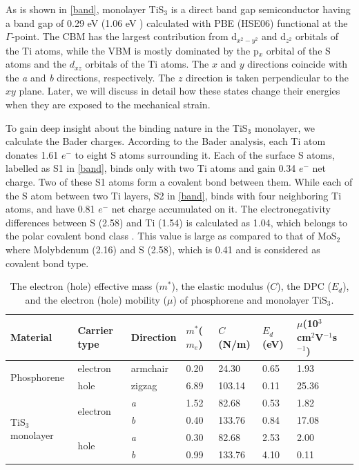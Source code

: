 As is shown in \autoref{band}, monolayer TiS$_3$ is a direct band gap semiconductor having a band gap of 0.29 eV (1.06 eV \cite{Dai2015}) calculated with PBE (HSE06) functional at the $\Gamma$-point.  The CBM has the largest contribution from d$_{x^2-y^2}$ and d$_{z^2}$ orbitals of the Ti atoms, while the VBM is mostly dominated by the p$_x$ orbital of the S atoms and  the $d_{xz}$ orbitals of the Ti atoms. The $x$ and $y$ directions coincide with the \textit{a} and \textit{b} directions, respectively. The $z$ direction is taken perpendicular to the $xy$ plane. Later, we will discuss in detail how these states change their energies when they are exposed to the mechanical strain.

To gain deep insight about the binding nature in the TiS$_3$ monolayer, we calculate the Bader charges\cite{Bader1,Bader2,Bader3,Bader4}. According to the Bader analysis, each Ti atom donates 1.61 $e^-$ to eight S atoms surrounding it. Each of the surface S atoms, labelled as S1 in \autoref{band}, binds only with two Ti atoms and gain 0.34 $e^-$ net charge. Two of these S1 atoms form a covalent bond between them. While each of the S atom between two Ti layers, S2 in \autoref{band}, binds with four neighboring Ti atoms, and have 0.81 $e^-$ net charge accumulated on it.  The electronegativity differences between S (2.58) and Ti (1.54) is calculated as 1.04, which belongs to the polar covalent bond class \cite{David2015}.  This value is large as compared to that of MoS$_2$ where Molybdenum (2.16) and S (2.58), which is 0.41 and is considered as covalent bond type.

\begin{table}[ht]
\caption{The electron (hole) effective mass ($m^*$), the elastic modulus ($C$), the DPC ($E_d$), and the electron (hole) mobility ($\mu$) of phosphorene and monolayer TiS$_3$.}
\centering
\begin{footnotesize}
\begin{tabularx}{\textwidth}{l|lXXXXXX}
\hline\hline
Material & Carrier type & Direction & $m^*$($m_e$) & $C$(N/m) & $E_d$(eV) &  $\mu$(10$^3$ cm$^2$V$^{-1}$s$^{-1}$)\\ \hline
\multirow{2}{*}{Phosphorene} & electron & armchair & 0.20 & 24.30 & 0.65 &  1.93 \\
& hole & zigzag & 6.89 & 103.14 & 0.11 & 25.36 \\ \hline
\multirow{4}{*}{TiS$_3$ monolayer} & \multirow{2}{*}{electron} & \textit{a} & 1.52 & 82.68 & 0.53 & 1.82 \\
&   & \textit{b} & 0.40 & 133.76 & 0.84 & 17.08 \\ 
& \multirow{2}{*}{hole} & \textit{a} & 0.30 & 82.68 & 2.53 & 2.00 \\ 
&   & \textit{b} & 0.99 & 133.76 & 4.10 & 0.11 \\ \hline\hline

\end{tabularx}
\label{unstrain}
\end{footnotesize}
\end{table}

